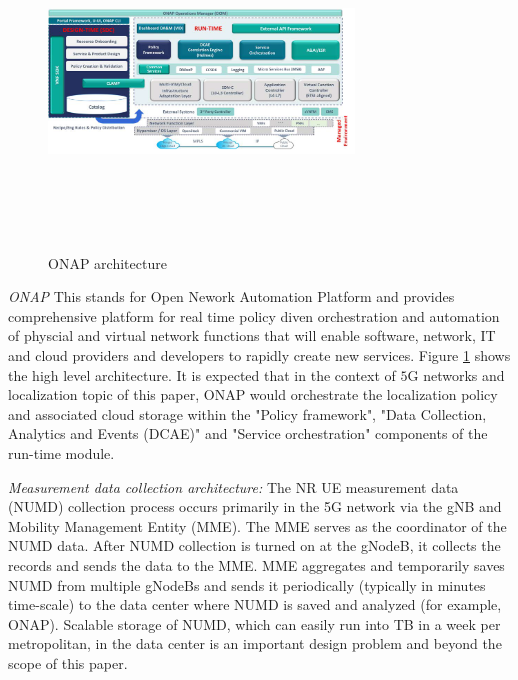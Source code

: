 \documentclass[conference, 10pt]{IEEEtran}
\begin{document}
\begin{figure}[t]
\begin{center}
\includegraphics[height=3.5in,width=3.2in]{./ONAP-architecture.png}
\caption{\label{fig:onap_arch}
{\small ONAP architecture}}
\end{center}
\end{figure}



{\em ONAP} This stands for Open Nework Automation Platform and provides comprehensive platform for real time policy diven orchestration and automation of physcial and virtual network functions that will enable software, network,
IT and cloud providers and developers to rapidly create new services. Figure \ref{fig:onap_arch} shows the high level architecture. It is expected that in the context of $5$G networks and localization topic of this paper, ONAP would orchestrate the localization policy and associated cloud storage within the "Policy framework", "Data Collection, Analytics and Events (DCAE)" and "Service orchestration" components of the run-time module. 

{\em Measurement data collection architecture:} The NR UE measurement data (NUMD) collection process occurs primarily in the 5G network via the gNB and Mobility Management Entity (MME). The MME serves as the coordinator of the NUMD data.
After NUMD collection is turned on at the gNodeB, it collects the records and sends
the data to the MME. MME aggregates and temporarily saves NUMD from multiple
gNodeBs and sends it periodically (typically in minutes time-scale) to the data
center  where NUMD is saved and analyzed (for example, ONAP). Scalable storage of NUMD, which can easily
run into TB in a week per metropolitan, in the data center is an important design
problem and beyond the scope of this paper.
\end{document}
